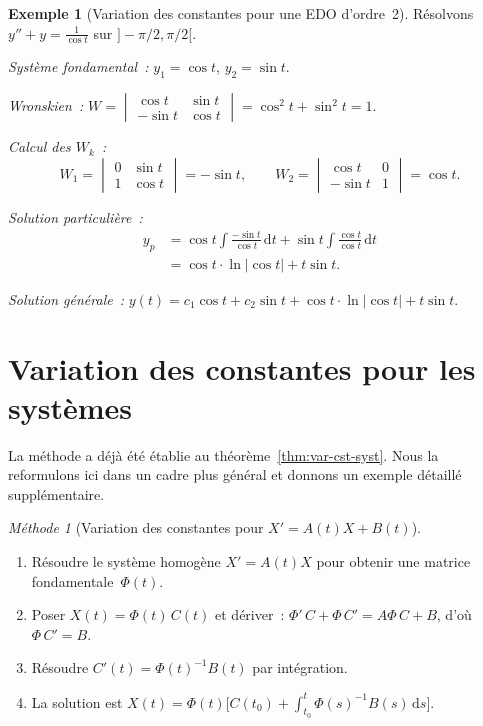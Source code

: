 \documentclass[12pt,a4paper,openany]{book}
\theoremstyle{definition}
\newtheorem{exemple}[definition]{Exemple}
\theoremstyle{plain}
\theoremstyle{remark}
\newtheorem{methode}[definition]{Méthode}
\newcommand{\dd}{\mathrm{d}}
\newcommand{\abs}[1]{\left|#1\right|}
\begin{document}
\begin{exemple}[Variation des constantes pour une EDO d'ordre~2]\label{ex:var-cst-ordre2}
  Résolvons $y'' + y = \frac{1}{\cos t}$ sur $]-\pi/2, \pi/2[$.

  \emph{Système fondamental~:} $y_1 = \cos t$, $y_2 = \sin t$.

  \emph{Wronskien~:}
  $W = \begin{vmatrix} \cos t & \sin t \\ -\sin t & \cos t \end{vmatrix}
  = \cos^2 t + \sin^2 t = 1$.

  \emph{Calcul des $W_k$~:}
  \[
    W_1 = \begin{vmatrix} 0 & \sin t \\ 1 & \cos t \end{vmatrix} = -\sin t,
    \qquad
    W_2 = \begin{vmatrix} \cos t & 0 \\ -\sin t & 1 \end{vmatrix} = \cos t.
  \]

  \emph{Solution particulière~:}
  \begin{align*}
    y_p &= \cos t \int \frac{-\sin t}{\cos t}\,\dd t
         + \sin t \int \frac{\cos t}{\cos t}\,\dd t \\
        &= \cos t \cdot \ln\abs{\cos t} + t\sin t.
  \end{align*}

  \emph{Solution générale~:}
  $y(t) = c_1 \cos t + c_2 \sin t + \cos t \cdot \ln\abs{\cos t} + t\sin t$.
\end{exemple}

\section{Variation des constantes pour les systèmes}\label{sec:var-cst-systemes}

La méthode a déjà été établie au théorème~\ref{thm:var-cst-syst}.
Nous la reformulons ici dans un cadre plus général et donnons un
exemple détaillé supplémentaire.

\begin{methode}[Variation des constantes pour $X' = A(t)X + B(t)$]\label{meth:var-cst-syst-detail}
  \begin{enumerate}
    \item Résoudre le système homogène $X' = A(t)X$ pour obtenir une
      matrice fondamentale~$\Phi(t)$.
    \item Poser $X(t) = \Phi(t)\,C(t)$ et dériver~:
      $\Phi'\,C + \Phi\,C' = A\Phi\,C + B$,
      d'où $\Phi\,C' = B$.
    \item Résoudre $C'(t) = \Phi(t)^{-1}B(t)$ par intégration.
    \item La solution est $X(t) = \Phi(t)\bigl[C(t_0) + \int_{t_0}^t \Phi(s)^{-1}B(s)\,\dd s\bigr]$.
  \end{enumerate}
\end{methode}
\end{document}

